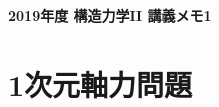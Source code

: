 \documentclass[10pt,a4j]{jarticle}
\newlength{\minitwocolumn}
\begin{document}
\newcommand{\fat}[1]{\mbox{\boldmath $#1$}}
\newcommand{\D}{\partial}
\newcommand{\w}{\omega}
\newcommand{\ga}{\alpha}
\newcommand{\gb}{\beta}
\newcommand{\gx}{\xi}
\newcommand{\gz}{\zeta}
\newcommand{\vhat}[1]{\hat{\fat{#1}}}
\newcommand{\spc}{\vspace{0.7\baselineskip}}
\newcommand{\halfspc}{\vspace{0.3\baselineskip}}

\newcommand{\twofig}[2]
 {
   \begin{figure}
     \begin{minipage}[t]{\minitwocolumn}
         \begin{center}   #1
         \end{center}
     \end{minipage}
         \hspace{\columnsep}
     \begin{minipage}[t]{\minitwocolumn}
         \begin{center} #2
         \end{center}
     \end{minipage}
   \end{figure}
 }
\begin{center}
	{\Large \bf 2019年度 構造力学II 講義メモ1} \\
\end{center}
\section{1次元軸力問題}
\end{document}
